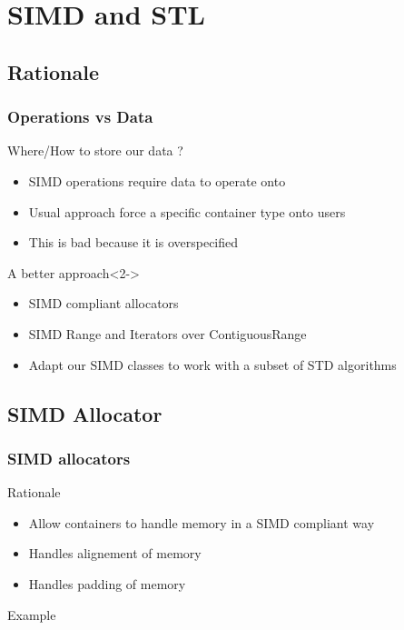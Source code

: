 \section{SIMD and STL}
\subsection{Rationale}
\frame
{
  \frametitle{Operations vs Data}
  \begin{block}{Where/How to store our data ?}
  \begin{itemize}
  \item SIMD operations require data to operate onto
  \item Usual approach force a specific container type onto users
  \item This is bad because it is overspecified
  \end{itemize}
  \end{block}{}

  \begin{block}{A better approach}<2->
  \begin{itemize}
  \item SIMD compliant allocators
  \item SIMD Range and Iterators over ContiguousRange
  \item Adapt our SIMD classes to work with a subset of STD algorithms
  \end{itemize}
  \end{block}{}
}


\subsection{SIMD Allocator}
\frame
{
  \frametitle{SIMD allocators}
  \begin{block}{Rationale}
  \begin{itemize}
  \item Allow containers to handle memory in a SIMD compliant way
  \item Handles alignement of memory
  \item Handles padding of memory
  \end{itemize}
  \end{block}{}

  \begin{block}{Example}
  \begin{center}
  \lstallocator
  \end{center}
  \end{block}{}
}

